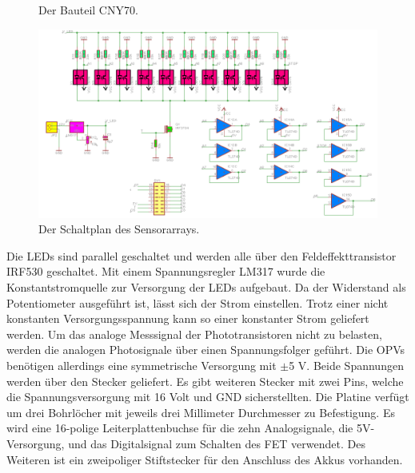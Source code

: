\documentclass[a4paper,bibtotoc,oneside]{scrbook}
\begin{document}
\begin{figure}
\centering
\caption{Der Bauteil CNY70.} \label{cny}
\end{figure} 

\begin{figure}[htbp]
\centering
\includegraphics[width=125mm]{img/array.png}
\caption{Der Schaltplan des Sensorarrays.}\label{array}
\end{figure}

\noindent Die LEDs sind parallel geschaltet und werden alle über den Feldeffekttransistor IRF530 \cite{irf} geschaltet.
Mit einem Spannungsregler LM317 wurde die Konstantstromquelle zur Versorgung der LEDs aufgebaut. Da der Widerstand als Potentiometer ausgeführt ist, lässt sich der Strom einstellen. Trotz einer nicht konstanten Versorgungsspannung kann so einer konstanter Strom geliefert werden. Um das analoge Messsignal der Phototransistoren nicht zu belasten, werden die analogen Photosignale über einen Spannungsfolger geführt. Die OPVs benötigen allerdings eine symmetrische Versorgung mit $\pm$5 V. Beide Spannungen werden über den Stecker geliefert.
Es gibt weiteren Stecker mit zwei Pins, welche die Spannungsversorgung mit 16 Volt und GND sicherstellten. 
Die Platine verfügt um drei Bohrlöcher mit jeweils drei Millimeter Durchmesser zu Befestigung.
Es wird eine 16-polige Leiterplattenbuchse für die zehn Analogsignale, die 5V-Versorgung, und das Digitalsignal zum Schalten des FET verwendet. Des Weiteren ist ein zweipoliger Stiftstecker für den Anschluss des Akkus vorhanden.
\end{document}
